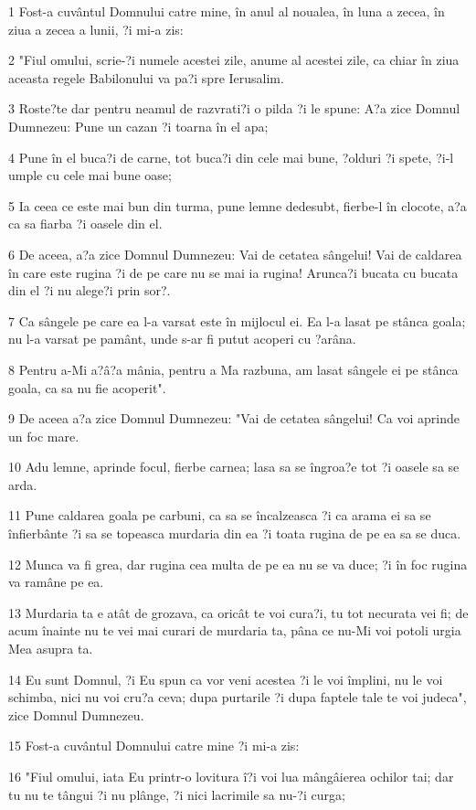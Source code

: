 \par 1 Fost-a cuvântul Domnului catre mine, în anul al noualea, în luna a zecea, în ziua a zecea a lunii, ?i mi-a zis:
\par 2 "Fiul omului, scrie-?i numele acestei zile, anume al acestei zile, ca chiar în ziua aceasta regele Babilonului va pa?i spre Ierusalim.
\par 3 Roste?te dar pentru neamul de razvrati?i o pilda ?i le spune: A?a zice Domnul Dumnezeu: Pune un cazan ?i toarna în el apa;
\par 4 Pune în el buca?i de carne, tot buca?i din cele mai bune, ?olduri ?i spete, ?i-l umple cu cele mai bune oase;
\par 5 Ia ceea ce este mai bun din turma, pune lemne dedesubt, fierbe-l în clocote, a?a ca sa fiarba ?i oasele din el.
\par 6 De aceea, a?a zice Domnul Dumnezeu: Vai de cetatea sângelui! Vai de caldarea în care este rugina ?i de pe care nu se mai ia rugina! Arunca?i bucata cu bucata din el ?i nu alege?i prin sor?.
\par 7 Ca sângele pe care ea l-a varsat este în mijlocul ei. Ea l-a lasat pe stânca goala; nu l-a varsat pe pamânt, unde s-ar fi putut acoperi cu ?arâna.
\par 8 Pentru a-Mi a?â?a mânia, pentru a Ma razbuna, am lasat sângele ei pe stânca goala, ca sa nu fie acoperit".
\par 9 De aceea a?a zice Domnul Dumnezeu: "Vai de cetatea sângelui! Ca voi aprinde un foc mare.
\par 10 Adu lemne, aprinde focul, fierbe carnea; lasa sa se îngroa?e tot ?i oasele sa se arda.
\par 11 Pune caldarea goala pe carbuni, ca sa se încalzeasca ?i ca arama ei sa se înfierbânte ?i sa se topeasca murdaria din ea ?i toata rugina de pe ea sa se duca.
\par 12 Munca va fi grea, dar rugina cea multa de pe ea nu se va duce; ?i în foc rugina va ramâne pe ea.
\par 13 Murdaria ta e atât de grozava, ca oricât te voi cura?i, tu tot necurata vei fi; de acum înainte nu te vei mai curari de murdaria ta, pâna ce nu-Mi voi potoli urgia Mea asupra ta.
\par 14 Eu sunt Domnul, ?i Eu spun ca vor veni acestea ?i le voi împlini, nu le voi schimba, nici nu voi cru?a ceva; dupa purtarile ?i dupa faptele tale te voi judeca", zice Domnul Dumnezeu.
\par 15 Fost-a cuvântul Domnului catre mine ?i mi-a zis:
\par 16 "Fiul omului, iata Eu printr-o lovitura î?i voi lua mângâierea ochilor tai; dar tu nu te tângui ?i nu plânge, ?i nici lacrimile sa nu-?i curga;
